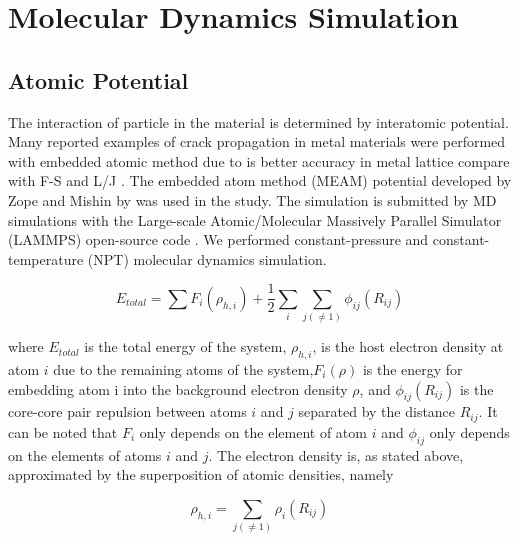 \documentclass[journal,article,submit,moreauthors,pdftex,10pt,a4paper]{Definitions/mdpi}
\begin{document}
\section{Molecular Dynamics Simulation }
	
\subsection{Atomic Potential}

The interaction of particle in the material is determined by interatomic potential. Many reported examples of crack propagation in metal materials were performed with embedded atomic method due to is better accuracy in metal lattice compare with F-S and L/J \cite{}. The embedded atom method (MEAM) potential developed by Zope and Mishin by \cite{} was used in the study. The simulation is submitted by MD simulations with the Large-scale Atomic/Molecular Massively Parallel Simulator (LAMMPS) open-source code \cite{}. We performed constant-pressure and constant-temperature (NPT) molecular dynamics simulation.
	
\begin{equation} \label{eq:eam} 
E_{total}= \displaystyle\sum F_i(\rho_{h,i})+\frac{1}{2}\sum_i\sum_{j(\neq1)}\phi_{ij}(R_{ij})
\end{equation}
	
where $E_{total}$ is the total energy of the system, $\rho_{h,i}$, is the host electron density at atom $i$ due to the remaining atoms of the system,$F_i(\rho)$ is the energy for embedding atom i into the background electron density $\rho$, and $\phi_{ij}(R_{ij})$ is the core-core pair repulsion between atoms $i$ and $j$ separated by the distance $R_{ij}$. It can be noted that $F_i$ only depends on the element of atom $i$ and $\phi_{ij}$ only depends on the elements of atoms $i$ and $j$. The electron density is, as stated above, approximated by the superposition of atomic densities, namely
	
	\begin{equation} \label{eq:eam} 
	\rho_{h,i}=\sum_{j(\neq1)} \rho_i(R_{ij})
	\end{equation}
	
\end{document}
